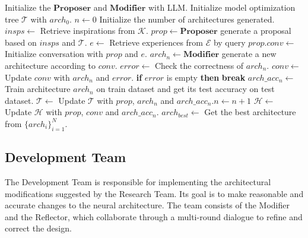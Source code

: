 \begin{algorithm}[t]
    \caption{Neural architecture design process of NADER}
    \begin{algorithmic}[1]
    \label{alg:nader}
    \STATE Initialize the $\mathbf{Proposer}$ and $\mathbf{Modifier}$ with LLM.
    \STATE Initialize model optimization tree $\mathcal{T}$ with $arch_0$.
    \STATE $n\leftarrow 0$ Initialize the number of architectures generated.
        \STATE $insps\leftarrow$ Retrieve inspirations from $\mathcal{K}$.
        \STATE $prop\leftarrow \mathbf{Proposer}$ generate a proposal based on $insps$ and $\mathcal{T}$.
        \STATE $e\leftarrow$ Retrieve experiences from $\mathcal{E}$ by query $prop$.\STATE $conv\leftarrow$ Initialize conversation with $prop$ and $e$.
            \STATE $arch_n\leftarrow \mathbf{Modifier}$ generate a new architecture according to $conv$.
            \STATE $error\leftarrow$ Check the correctness of $arch_n$.
            \STATE $conv\leftarrow$ Update $conv$ with $arch_n$ and $error$.
            \STATE \textbf{if} $error$ is empty \textbf{then} \textbf{break}
        \ENDFOR
            \STATE $arch\_acc_{n}\leftarrow$ Train architecture $arch_n$ on train dataset and get its test accuracy on test dataset.
            \STATE $\mathcal{T}\leftarrow$ Update $\mathcal{T}$ with $prop$, $arch_n$ and $arch\_acc_n$.\STATE $n\leftarrow n+1$
        \ENDIF
        \STATE $\mathcal{H}\leftarrow$ Update $\mathcal{H}$ with $prop$, $conv$ and $arch\_acc_n$.
    \ENDWHILE
    \STATE $arch_{best}\leftarrow$ Get the best architecture from $\{arch_{i}\}_{i=1}^N$.
    \end{algorithmic}
\end{algorithm}
\subsection{Development Team}
The Development Team is responsible for implementing the architectural modifications suggested by the Research Team. Its goal is to make reasonable and accurate changes to the neural architecture. The team consists of the Modifier and the Reflector, which collaborate through a multi-round dialogue to refine and correct the design.

